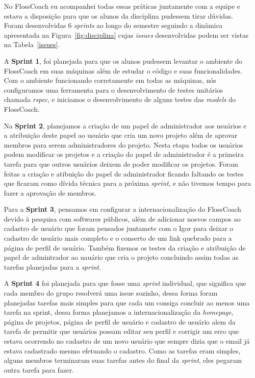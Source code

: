 No FlossCoach eu acompanhei todas essas práticas juntamente com a equipe e estava
a disposição para que os alunos da disciplina pudessem tirar dúvidas. Foram desenvolvidas
6 \textit{sprints} ao longo do semestre seguindo a dinâmica apresentada na Figura~\ref{fig:disciplina} 
cujas \textit{issues} desenvolvidas podem ser vistas na Tabela~\ref{issues}.

A \textbf{Sprint 1}, foi planejada para que os alunos pudessem levantar o ambiente
do FlossCoach em suas máquinas além de estudar o código e suas funcionalidades. Com o
ambiente funcionando corretamente em todas as máquinas, nós configuramos uma ferramenta
para o desenvolvimento de testes unitários chamada \textit{rspec}, e iniciamos o 
desenvolvimento de alguns testes das \textit{models} do FlossCoach. 

Na \textbf{Sprint 2}, planejamos a criação de um papel de administrador aos usuários
e a atribuição deste papel ao usuário que cria um novo projeto além de aprovar 
membros para serem administradores do projeto. Nesta etapa todos os usuários podem
modificar os projetos e a criação do papel de administrador é a primeira tarefa 
para que outros usuários deixem de poder modificar os projetos. Foram feitas a 
criação e atibuição do papel de administrador ficando faltando os testes que
ficaram como dívida técnica para a próxima \textit{sprint}, e não tivemos tempo para fazer a 
aprovação de membros. 

Para a \textbf{Sprint 3}, pensamos em configurar a internacionalização do FlossCoach
devido à pesquisa com softwares públicos, além de adicionar nosvos campos ao cadastro 
de usuário que foram pensados juntamete com o Igor para deixar o cadastro de usuário 
mais completo e o conserto de um link quebrado para a página de perfil de usuário.
Também fizemos os testes da criação e atribuição de papel de admintrador ao uauário
que cria o projeto concluindo assim todas as tarefas planejadas para a \textit{sprint}.

A \textbf{Sprint 4} foi planejada para que fosse uma \textit{sprint} individual, que
significa que cada membro do grupo resolverá uma issue sozinho, dessa forma foram 
planejadas tarefas mais simples para que cada um consiga concluir ao menos uma
tarefa na sprint, dessa forma planejamos a internacionalização da \textit{homepage},
página de projetos, página de perfil de usuário e cadastro de usuário alem da 
tarefa de permitir que usuários possam editar seu perfil e corrigir um erro que
estava ocorrendo no cadastro de um novo usuário que sempre dizia que o email já
estava cadastrado mesmo efetuando o  cadastro. Como as tarefas eram simples,
alguns membros terminaram suas tarefas antes do final da \textit{sprint}, eles 
pegaram outra tarefa para fazer.

